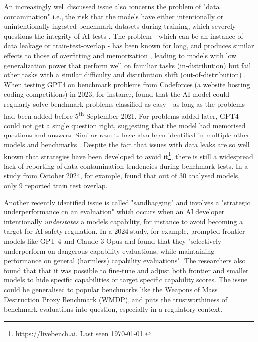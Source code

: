 An increasingly well discussed issue also concerns the problem of "data contamination" i.e., the risk that the models have either intentionally or unintentionally ingested benchmark datasets during training, which severely questions the integrity of AI tests \cite{xu2024, zhang2024, besen2024, magar2022, roberts2023}. The problem - which can be an instance of data leakage \cite{kaufman_leakage_2012} or train-test-overlap \cite{lewis2021} - has been known for long, and produces similar effects to those of overfitting and memorization \cite{tirumala2022,magar2022}, leading to models with low generalization power that perform well on familiar tasks (in-distribution) but fail other tasks with a similar difficulty and distribution shift (out-of-distribution) \cite{yuan2023, xu2024, zhang2024, besen2024, magar2022, roberts2023, narayanan2023}. When testing GPT4 on benchmark problems from Codeforces (a website hosting coding competitions) in 2023, for instance, \citet{narayanan2023} found that the AI model could regularly solve benchmark problems classified as easy - as long as the problems had been added before 5\textsuperscript{th} September 2021. For problems added later, GPT4 could not get a single question right, suggesting that the model had memorised questions and answers. Similar results have also been identified in multiple other models and benchmarks \cite{xu2024, zhang2024, besen2024, magar2022, roberts2023}. 
Despite the fact that issues with data leaks are so well known that strategies have been developed to avoid it\footnote{\url{https://livebench.ai}. Last seen \today.}, there is still a widespread lack of reporting of data contamination tendencies during benchmark tests. In a study from October 2024, for example, \citet{zhang2024} found that out of 30 analysed models, only 9 reported train test overlap. 

Another recently identified issue is called "sandbagging" and involves a "strategic underperformance on an evaluation" which occurs when an AI developer intentionally \textit{understates} a models capability, for instance to avoid becoming a target for AI safety regulation. In a 2024 study, for example, \citet[p.~1]{weij2024} prompted frontier models like GPT-4 and Claude 3 Opus and found that they "selectively underperform on dangerous capability evaluations, while maintaining performance on general (harmless) capability evaluations". The researchers also found that that it was possible to fine-tune and adjust both frontier and smaller models to hide specific capabilities or target specific capability scores. The issue could be generalised to popular benchmarks like the Weapons of Mass Destruction Proxy Benchmark (WMDP), and puts the trustworthiness of benchmark evaluations into question, especially in a regulatory context. 

